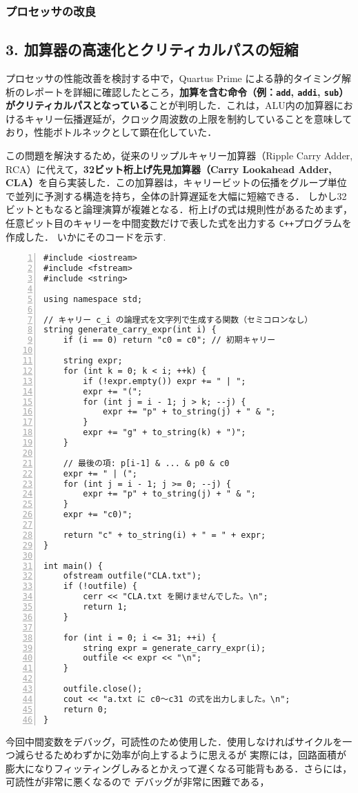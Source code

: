 \documentclass[autodetect-engine,dvi=dvipdfmx,ja=standard,
               a4j,11pt]{bxjsarticle}
\begin{document}
\subsubsection{プロセッサの改良}
\subsection*{3. 加算器の高速化とクリティカルパスの短縮}

プロセッサの性能改善を検討する中で，Quartus Prime による静的タイミング解析のレポートを詳細に確認したところ，\textbf{加算を含む命令（例：\texttt{add}, \texttt{addi}, \texttt{sub}）がクリティカルパスとなっている}ことが判明した．これは，ALU内の加算器におけるキャリー伝播遅延が，クロック周波数の上限を制約していることを意味しており，性能ボトルネックとして顕在化していた．

この問題を解決するため，従来のリップルキャリー加算器（Ripple Carry Adder, RCA）に代えて，\textbf{32ビット桁上げ先見加算器（Carry Lookahead Adder, CLA）}を自ら実装した．この加算器は，キャリービットの伝播をグループ単位で並列に予測する構造を持ち，全体の計算遅延を大幅に短縮できる．
しかし32ビットともなると論理演算が複雑となる．桁上げの式は規則性があるためまず，任意ビット目のキャリーを中間変数だけで表した式を出力する
\verb|C++|プログラムを作成した．
いかにそのコードを示す.
\begin{Verbatim}[numbers=left, xleftmargin=8mm, numbersep=6pt,
    fontsize=\small, baselinestretch=0.8]
#include <iostream>
#include <fstream>
#include <string>

using namespace std;

// キャリー c_i の論理式を文字列で生成する関数（セミコロンなし）
string generate_carry_expr(int i) {
    if (i == 0) return "c0 = c0"; // 初期キャリー

    string expr;
    for (int k = 0; k < i; ++k) {
        if (!expr.empty()) expr += " | ";
        expr += "(";
        for (int j = i - 1; j > k; --j) {
            expr += "p" + to_string(j) + " & ";
        }
        expr += "g" + to_string(k) + ")";
    }

    // 最後の項: p[i-1] & ... & p0 & c0
    expr += " | (";
    for (int j = i - 1; j >= 0; --j) {
        expr += "p" + to_string(j) + " & ";
    }
    expr += "c0)";

    return "c" + to_string(i) + " = " + expr;
}

int main() {
    ofstream outfile("CLA.txt");
    if (!outfile) {
        cerr << "CLA.txt を開けませんでした。\n";
        return 1;
    }

    for (int i = 0; i <= 31; ++i) {
        string expr = generate_carry_expr(i);
        outfile << expr << "\n";
    }

    outfile.close();
    cout << "a.txt に c0〜c31 の式を出力しました。\n";
    return 0;
}    
\end{Verbatim}
今回中間変数をデバッグ，可読性のため使用した．使用しなければサイクルを一つ減らせるためわずかに効率が向上するように思えるが
実際には，回路面積が膨大になりフィッティングしみるとかえって遅くなる可能背もある．さらには，可読性が非常に悪くなるので
デバッグが非常に困難である，
\end{document}
